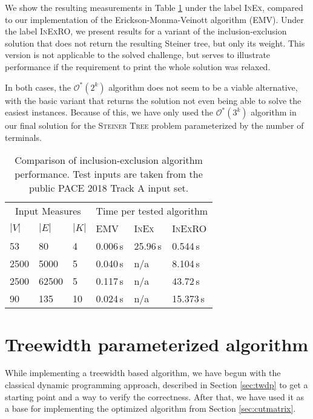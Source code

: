 \documentclass[thesis=M,english,hidelinks]{FITthesis}[2012/10/20]
\theoremstyle{definition}
\begin{document}
We show the resulting measurements in Table \ref{tab:nederlof} under the label \textsc{InEx}, compared to our
implementation of the Erickson-Monma-Veinott algorithm (\textsc{EMV}). Under the label \textsc{InExRO}, we present
results for a variant of the inclusion-exclusion solution that does not return the resulting Steiner tree, but only its weight.
This version is not applicable to the solved challenge, but serves to illustrate performance if the requirement to print
the whole solution was relaxed.

In both cases, the $\mathcal{O}^*(2^k)$ algorithm does not seem to be a viable alternative, with the basic variant that
returns the solution not even being able to solve the easiest instances. Because of this, we have only used the
$\mathcal{O}^*(3^k)$ algorithm in our final solution for the \textsc{Steiner Tree} problem parameterized by the number
of terminals.

\begin{table}[ht]

    \centering
    \begin{tabular}{ m{1.5cm} m{1.5cm} m{1.5cm} | m{1.5cm} m{1.5cm} m{1.5cm} }
        \multicolumn{3}{c}{Input Measures} & \multicolumn{3}{c}{Time per tested algorithm} \vspace{0.25cm} \\
        $|V|$ & $|E|$ & $|K|$ & \textsc{EMV} & \textsc{InEx} & \textsc{InExRO} \\
        \midrule
        53 & 80 & 4 & 0.006\,s & 25.96\,s & 0.544\,s \\
        2500 & 5000 & 5 & 0.040\,s & n/a & 8.104\,s \\
        2500 & 62500 & 5 & 0.117\,s & n/a & 43.72\,s \\
        90 & 135 & 10 & 0.024\,s & n/a & 15.373\,s \\
    \end{tabular}

    \caption{Comparison of inclusion-exclusion algorithm performance. Test inputs are taken from the
    public PACE 2018 Track A input set.}
    \label{tab:nederlof}
\end{table}

\section{Treewidth parameterized algorithm}
\label{sec:twimpl}

While implementing a treewidth based algorithm, we have begun with the classical dynamic programming approach, described
in Section \ref{sec:twdp} to get a starting point and a way to verify the correctness.  After that, we have used it as a
base for implementing the optimized algorithm from Section \ref{sec:cutmatrix}.
\end{document}
